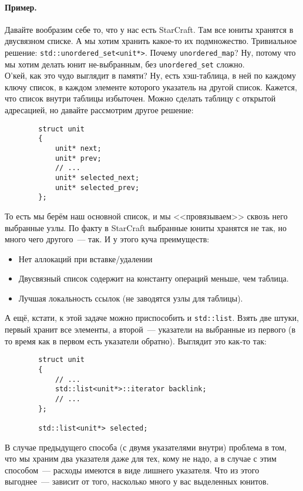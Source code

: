 \documentclass{article}
\begin{document}
    \paragraph{Пример.}
    Давайте вообразим себе то, что у нас есть StarCraft. Там все юниты хранятся в двусвязном списке. А мы хотим хранить какое-то их подмножество. Тривиальное решение: \texttt{std::unordered_set<unit*>}. Почему \texttt{unordered_map}? Ну, потому что мы хотим делать юнит не-выбранным, без \texttt{unordered_set} сложно.\\
    О'кей, как это чудо выглядит в памяти? Ну, есть хэш-таблица, в ней по каждому ключу список, в каждом элементе которого указатель на другой список. Кажется, что список внутри таблицы избыточен. Можно сделать таблицу с открытой адресацией, но давайте рассмотрим другое решение:
    \begin{verbatim}
        struct unit
        {
            unit* next;
            unit* prev;
            // ...
            unit* selected_next;
            unit* selected_prev;
        };
    \end{verbatim}
    То есть мы берём наш основной список, и мы <<провязываем>> сквозь него выбранные узлы. По факту в StarCraft выбранные юниты хранятся не так, но много чего другого~--- так. И у этого куча преимуществ:
    \begin{itemize}
        \item Нет аллокаций при вставке/удалении
        \item Двусвязный список содержит на константу операций меньше, чем таблица.
        \item Лучшая локальность ссылок (не заводятся узлы для таблицы).
    \end{itemize}
    А ещё, кстати, к этой задаче можно приспособить и \texttt{std::list}. Взять две штуки, первый хранит все элементы, а второй~--- указатели на выбранные из первого (в то время как в первом есть указатели обратно). Выглядит это как-то так:
    \begin{verbatim}
        struct unit
        {
            // ...
            std::list<unit*>::iterator backlink;
            // ...
        };

        std::list<unit*> selected;
    \end{verbatim}
    В случае предыдущего способа (с двумя указателями внутри) проблема в том, что мы храним два указателя даже для тех, кому не надо, а в случае с этим способом~--- расходы имеются в виде лишнего указателя. Что из этого выгоднее~--- зависит от того, насколько много у вас выделенных юнитов.
\end{document}
